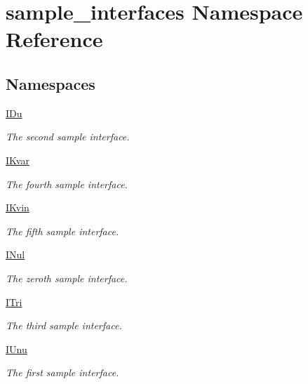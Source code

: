 \hypertarget{namespacesample__interfaces}{\section{sample\-\_\-interfaces Namespace Reference}
\label{namespacesample__interfaces}
}
\subsection*{Namespaces}
\begin{DoxyCompactItemize}
\item 
\hyperlink{namespacesample__interfaces_1_1_i_du}{I\-Du}
\begin{DoxyCompactList}\small\item\em The second sample interface. \end{DoxyCompactList}\item 
\hyperlink{namespacesample__interfaces_1_1_i_kvar}{I\-Kvar}
\begin{DoxyCompactList}\small\item\em The fourth sample interface. \end{DoxyCompactList}\item 
\hyperlink{namespacesample__interfaces_1_1_i_kvin}{I\-Kvin}
\begin{DoxyCompactList}\small\item\em The fifth sample interface. \end{DoxyCompactList}\item 
\hyperlink{namespacesample__interfaces_1_1_i_nul}{I\-Nul}
\begin{DoxyCompactList}\small\item\em The zeroth sample interface. \end{DoxyCompactList}\item 
\hyperlink{namespacesample__interfaces_1_1_i_tri}{I\-Tri}
\begin{DoxyCompactList}\small\item\em The third sample interface. \end{DoxyCompactList}\item 
\hyperlink{namespacesample__interfaces_1_1_i_unu}{I\-Unu}
\begin{DoxyCompactList}\small\item\em The first sample interface. \end{DoxyCompactList}\end{DoxyCompactItemize}
